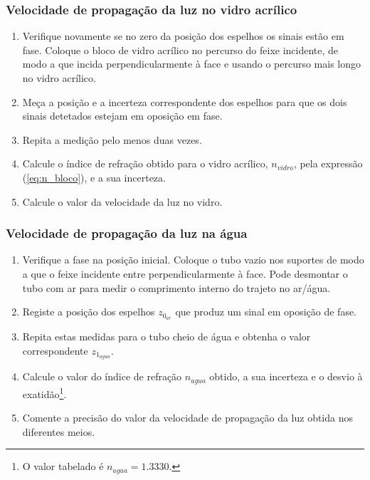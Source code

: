 \documentclass[a4paper,12pt]{article}      %
\begin{document}
\subsubsection{\sf Velocidade de propagação da luz no vidro acrílico}
\begin{enumerate}
\item Verifique novamente se no zero da posição dos espelhos os sinais estão em fase. Coloque o bloco de vidro 
acrílico no percurso do feixe incidente, de modo a que incida perpendicularmente à face e usando o percurso 
mais longo no vidro acrílico. 
\item Meça a posição e a incerteza correspondente dos espelhos para que os dois sinais detetados estejam em oposição em fase. 
\item Repita a medição pelo menos 
duas vezes.
\item Calcule o índice de refração obtido para o vidro acrílico, $n_{vidro}$, pela expressão (\ref{eq:n_bloco}),  e a sua incerteza. 
\item Calcule o valor da velocidade da luz no vidro.
\end{enumerate}

\subsubsection{\sf Velocidade de propagação da luz na água}
\begin{enumerate}
\item Verifique a fase na posição inicial. Coloque o tubo vazio  nos suportes de modo a que o feixe incidente entre perpendicularmente à face. Pode desmontar o tubo com ar para medir o comprimento interno do trajeto no ar/água.
\item Registe a posição dos espelhos $z_{0_{ar}}$ que produz um sinal em oposição de fase. 
\item Repita estas medidas para o tubo cheio de água e obtenha o valor correspondente $z_{1_{agua}}$. 
\item Calcule o valor do índice de refração $n_{agua}$ obtido, a sua incerteza e o desvio à exatidão\footnote{O valor tabelado é $n_{agua}=1.3330$.}. 
\item Comente a precisão do valor da velocidade de propagação da luz obtida nos 
diferentes meios.
\end{enumerate}
\end{document}
